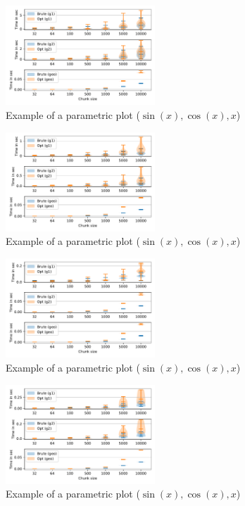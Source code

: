 \begin{figure}[h]
\centering
\includegraphics[width=0.5\textwidth]{data/raw/go.pdf}
\caption{Example of a parametric plot ($\sin (x), \cos(x), x$)}
\end{figure}

\begin{figure}[h]
\centering
\includegraphics[width=0.5\textwidth]{data/raw/eclass_514en.pdf}
\caption{Example of a parametric plot ($\sin (x), \cos(x), x$)}
\end{figure}

\begin{figure}[h]
\centering
\includegraphics[width=0.5\textwidth]{data/raw/geospecies.pdf}
\caption{Example of a parametric plot ($\sin (x), \cos(x), x$)}
\end{figure}

\begin{figure}[h]
\centering
\includegraphics[width=0.5\textwidth]{data/raw/enzyme.pdf}
\caption{Example of a parametric plot ($\sin (x), \cos(x), x$)}
\end{figure}

